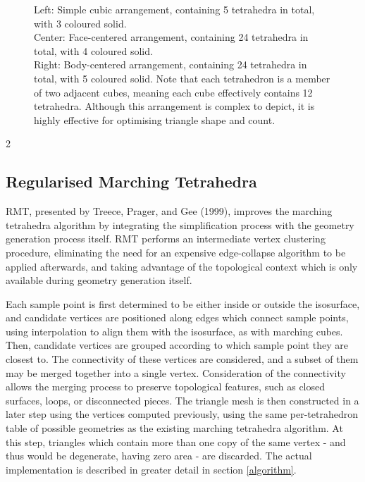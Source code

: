 \documentclass[]{article}
\begin{document}
\begin{figure}
    \centering
    
    \caption{Left: Simple cubic arrangement, containing 5 tetrahedra in total, with 3 coloured solid.\\
Center: Face-centered arrangement, containing 24 tetrahedra in total, with 4 coloured solid.\\
Right: Body-centered arrangement, containing 24 tetrahedra in total, with 5 coloured solid. Note that each tetrahedron is a member of two adjacent cubes, meaning each cube effectively contains 12 tetrahedra. Although this arrangement is complex to depict, it is highly effective for optimising triangle shape and count.}
    \label{fig:arrangements}
\end{figure}
\FloatBarrier
\begin{multicols}{2}

\subsection{Regularised Marching Tetrahedra}\label{regularised-marching-tetrahedra}

RMT, presented by Treece, Prager, and Gee (1999), improves the marching tetrahedra algorithm by integrating the simplification process with the geometry generation process itself. RMT performs an intermediate vertex clustering procedure, eliminating the need for an expensive edge-collapse algorithm to be applied afterwards, and taking advantage of the topological context which is only available during geometry generation itself.

Each sample point is first determined to be either inside or outside the isosurface, and candidate vertices are positioned along edges which connect sample points, using interpolation to align them with the isosurface, as with marching cubes. Then, candidate vertices are grouped
according to which sample point they are closest to. The connectivity of these vertices are considered, and a subset of them may be merged together into a single vertex. Consideration of the connectivity allows the merging process to preserve topological features, such as closed
surfaces, loops, or disconnected pieces. The triangle mesh is then constructed in a later step using the vertices computed previously, using the same per-tetrahedron table of possible geometries as the existing marching tetrahedra algorithm. At this step, triangles which contain more than one copy of the same vertex - and thus would be \textquotesingle degenerate\textquotesingle, having zero area - are discarded. The actual implementation is described in greater detail in section \ref{algorithm}.


\end{multicols}
\end{document}
